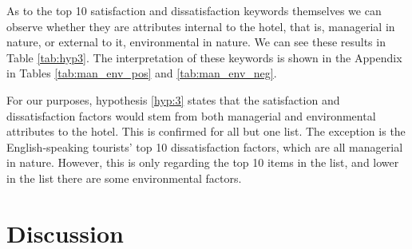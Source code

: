 As to the top 10 satisfaction and dissatisfaction keywords themselves we can observe whether they are attributes internal to the hotel, that is, managerial in nature, or external to it, environmental in nature. We can see these results in Table \ref{tab:hyp3}. The interpretation of these keywords is shown in the Appendix in Tables \ref{tab:man_env_pos} and \ref{tab:man_env_neg}.

\begin{table}[hbp]
\caption{Managerial and Environmental nature of the most frequently used keywords}
\label{tab:hyp3}
\end{table}

For our purposes, hypothesis \ref{hyp:3} states that the satisfaction and dissatisfaction factors would stem from both managerial and environmental attributes to the hotel. This is confirmed for all but one list. The exception is the English-speaking tourists' top 10 dissatisfaction factors, which are all managerial in nature. However, this is only regarding the top 10 items in the list, and lower in the list there are some environmental factors.

\section{Discussion}\label{discussion}

